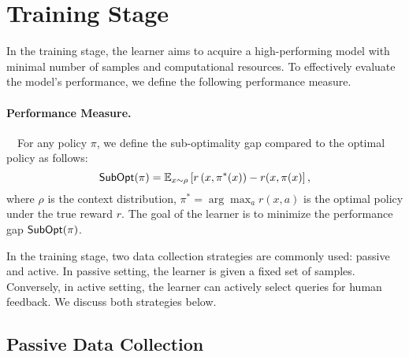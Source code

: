 \section{Training Stage}
\label{sec:train}
\vspace{-1mm}
In the training stage, the learner aims to acquire a high-performing model with minimal number of samples and computational resources. To effectively evaluate the model's performance, we define the following performance measure.

\paragraph{Performance Measure.}~~For any policy $\pi$, we define the sub-optimality gap compared to the optimal policy as follows:
\begin{equation}
  \operatorname*{\mathsf{SubOpt}}(\pi) = \mathbb{E}_{x \sim \rho}\left[r\left(x, \pi^{*}(x)\right)-r(x, \pi(x)\right],
\end{equation}
where $\rho$ is the context distribution, $\pi^{*}=\arg \max _a r(x, a)$ is the optimal policy under the true reward $r$. The goal of the learner is to minimize the performance gap $\operatorname*{\mathsf{SubOpt}}(\pi)$.

In the training stage, two data collection strategies are commonly used: passive and active. In passive setting, the learner is given a fixed set of samples. Conversely, in active setting, the learner can actively select queries for human feedback. We discuss both strategies below.

\subsection{Passive Data Collection}
\label{subsec:passive}

